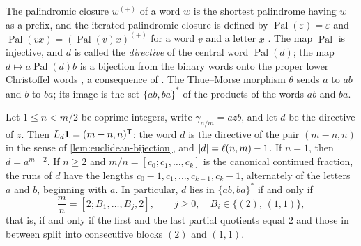 The palindromic closure $w^{(+)}$ of a word $w$ is the shortest palindrome
having $w$ as a prefix, and the iterated palindromic closure is defined by
$\operatorname{Pal}(\varepsilon)=\varepsilon$ and
$\operatorname{Pal}(vx)=(\operatorname{Pal}(v)x)^{(+)}$ for a word $v$ and a letter $x$
\cite{DeLuca1997}. The map $\operatorname{Pal}$ is injective, and $d$ is called the
\emph{directive} of the central word $\operatorname{Pal}(d)$; the map
$d\mapsto a\operatorname{Pal}(d)b$ is a bijection from the binary words onto the
proper lower Christoffel words
\cite[Section~2 and the proof of Theorem~1]{ReutenauerVuillon2017}, a consequence of
\cite[Corollary~3.1]{BertheDeLucaReutenauer2008}. The Thue--Morse morphism
$\theta$ sends $a$ to $ab$ and $b$ to $ba$; its image is the set $\{ab,ba\}^*$
of the products of the words $ab$ and $ba$.

\begin{lemma}\label{lem:directives}
Let $1\leqslant n<m/2$ be coprime integers, write $\gamma_{n/m}=azb$, and let $d$
be the directive of $z$. Then $L_d{\bf1}=(m-n,n)^{\mathsf T}$: the word $d$ is the
directive of the pair $(m-n,n)$ in the sense of \cref{lem:euclidean-bijection},
and $\lvert d\rvert=\ell(n,m)-1$. If $n=1$, then $d=a^{m-2}$. If $n\geqslant2$ and
$m/n=[c_0;c_1,\ldots,c_k]$ is the canonical continued fraction, the runs of $d$
have the lengths $c_0-1,c_1,\ldots,c_{k-1},c_k-1$, alternately of the letters
$a$ and $b$, beginning with $a$. In particular, $d$ lies in $\{ab,ba\}^*$ if and
only if
\begin{equation}\label{eq:block-form}
 \frac mn=[2;B_1,\ldots,B_j,2],\qquad j\geqslant0,\quad B_i\in\{(2),\,(1,1)\},
\end{equation}
that is, if and only if the first and the last partial quotients equal $2$
and those in between split into consecutive blocks $(2)$ and $(1,1)$.
\end{lemma}

